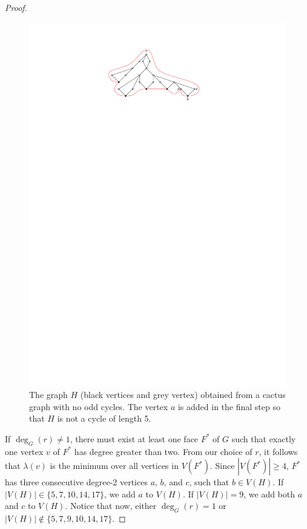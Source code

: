 \documentclass{cccg16}
\begin{document}
\begin{proof}
 \begin{figure}
    \begin{center}
        \includegraphics{figs/cactus}
    \end{center}
    \caption{The graph $H$ (black vertices and grey vertex) obtained
        from a cactus graph with no odd cycles.  The vertex $a$ is added
        in the final step so that $H$ is not a cycle of length 5.}
 \end{figure}

If $\deg_G(r)\ne 1$, there must exist at least one face $F^*$ of $G$ such
that exactly one vertex $v$ of $F^*$ has degree greater than two. From
our choice of $r$, it follows that $\lambda(v)$ is the minimum over all
vertices in $V(F^*)$.  Since $|V(F^*)|\ge 4$, $F^*$ has three consecutive
degree-2 vertices $a$, $b$, and $c$, such that $b\in V(H)$. If $|V(H)|\in
\{5,7,10,14,17\}$, we add $a$ to $V(H)$. If $|V(H)|=9$, we add both $a$
and $c$ to $V(H)$. Notice that now, either $\deg_G(r)=1$ or $|V(H)|\notin
\{5,7,9,10,14,17\}$.


\end{proof}
\end{document}
